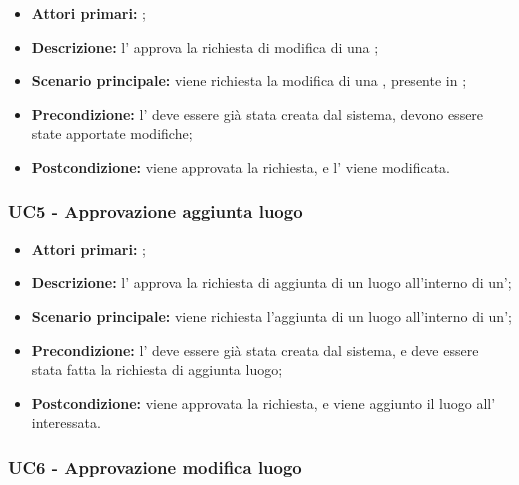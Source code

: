\documentclass[../analisi-dei-requisiti]{subfiles}
\begin{document}
\begin{itemize}
  \item \textbf{Attori primari:} ;
  \item \textbf{Descrizione:} l' approva la richiesta di modifica di una ;
  \item \textbf{Scenario principale:} viene richiesta la modifica di una , presente in ;
  \item \textbf{Precondizione:} l' deve essere già stata creata dal sistema, devono essere state apportate modifiche;
  \item \textbf{Postcondizione:} viene approvata la richiesta, e l' viene modificata.

\end{itemize}
\subsubsection{UC5 - Approvazione aggiunta luogo}
\label{subsub:UC5}

\begin{itemize}
  \item \textbf{Attori primari:} ;
  \item \textbf{Descrizione:} l' approva la richiesta di aggiunta di un luogo all'interno di un';
  \item \textbf{Scenario principale:} viene richiesta l'aggiunta di un luogo all'interno di un';
  \item \textbf{Precondizione:} l' deve essere già stata creata dal sistema, e deve essere stata fatta la richiesta di aggiunta luogo;
  \item \textbf{Postcondizione:} viene approvata la richiesta, e viene aggiunto il luogo all' interessata.

\end{itemize}
\subsubsection{UC6 - Approvazione modifica luogo}
\label{subsub:UC6}
\end{document}
